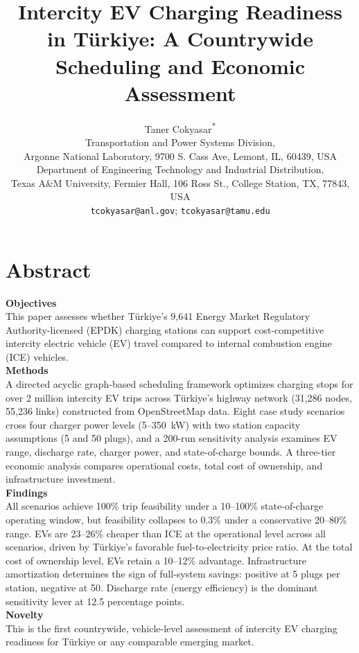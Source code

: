 \documentclass[numbered]{trbunofficial}
\title{Intercity EV Charging Readiness in T\"{u}rkiye: A Countrywide Scheduling and Economic Assessment}
\author{%
  Taner Cokyasar\textsuperscript{*}\\[4pt]
  Transportation and Power Systems Division, \\Argonne National Laboratory, 9700 S. Cass Ave, Lemont, IL, 60439, USA\\
  Department of Engineering Technology and Industrial Distribution, \\Texas A\&M University, Fermier Hall, 106 Ross St., College Station, TX, 77843, USA\\
  \texttt{tcokyasar@anl.gov}; \texttt{tcokyasar@tamu.edu}
}
\date{}
\begin{document}
\maketitle

\section*{Abstract}
\vspace{10pt}
\noindent\textbf{Objectives}\\
This paper assesses whether T\"{u}rkiye's 9,641 Energy Market Regulatory Authority-licensed (EPDK) charging stations can support cost-competitive intercity electric vehicle (EV) travel compared to internal combustion engine (ICE) vehicles.\\

\noindent\textbf{Methods}\\
A directed acyclic graph-based scheduling framework optimizes charging stops for over 2 million intercity EV trips across T\"{u}rkiye's highway network (31,286 nodes, 55,236 links) constructed from OpenStreetMap data. Eight case study scenarios cross four charger power levels (5--350~kW) with two station capacity assumptions (5 and 50 plugs), and a 200-run sensitivity analysis examines EV range, discharge rate, charger power, and state-of-charge bounds. A three-tier economic analysis compares operational costs, total cost of ownership, and infrastructure investment.\\

\noindent\textbf{Findings}\\
All scenarios achieve 100\% trip feasibility under a 10--100\% state-of-charge operating window, but feasibility collapses to 0.3\% under a conservative 20--80\% range. EVs are 23--26\% cheaper than ICE at the operational level across all scenarios, driven by T\"{u}rkiye's favorable fuel-to-electricity price ratio. At the total cost of ownership level, EVs retain a 10--12\% advantage. Infrastructure amortization determines the sign of full-system savings: positive at 5 plugs per station, negative at 50. Discharge rate (energy efficiency) is the dominant sensitivity lever at 12.5 percentage points.\\

\noindent\textbf{Novelty}\\
This is the first countrywide, vehicle-level assessment of intercity EV charging readiness for T\"{u}rkiye or any comparable emerging market.\\
\end{document}
